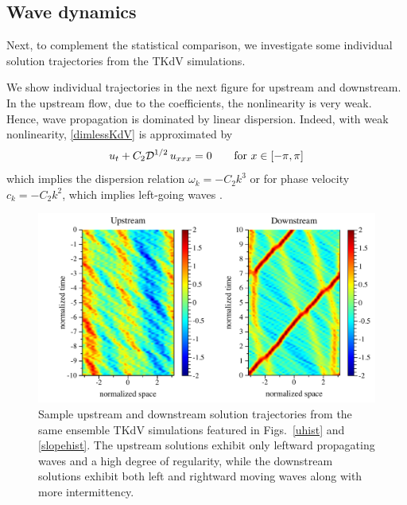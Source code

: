 \documentclass[11pt]{article}
\newcommand{\vsp}[1]{\vspace{#1 pc} \noindent}
\newcommand{\drat}{\mathcal{D}}
\begin{document}
\subsection{Wave dynamics}

Next, to complement the statistical comparison, we investigate some individual solution trajectories from the TKdV simulations.

\vsp{5}
We show individual trajectories in the next figure for upstream and downstream. In the upstream flow, due to the coefficients, the nonlinearity is very weak. Hence, wave propagation is dominated by linear dispersion. Indeed, with weak nonlinearity, \eqref{dimlessKdV} is approximated by
\begin{equation}
u_t + C_2 \drat^{1/2} \, u_{xxx} = 0
\qquad \text{for } x \in [-\pi,\pi] \\
\end{equation}
which implies the dispersion relation $\omega_k = -C_2 k^3$ or for phase velocity $c_k = -C_2 k^2$, which implies left-going waves \cite{majdaqi2019}.

\begin{figure}%
\begin{center}
\includegraphics[width = 0.99 \linewidth]{Figs/trajectories.pdf}
\caption{
Sample upstream and downstream solution trajectories from the same ensemble TKdV simulations featured in Figs.~\ref{uhist} and \ref{slopehist}. The upstream solutions exhibit only leftward propagating waves and a high degree of regularity, while the downstream solutions exhibit both left and rightward moving waves along with more intermittency.
}
\label{trajectories}
\end{center}
\end{figure}
\end{document}

